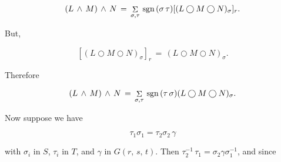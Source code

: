 \[(L\,\wedge\,M)\,\wedge\,N\,=\,\mathop{\Sigma}\limits_{\sigma,\tau}\,\mathop{ \rm sgn}\nolimits\,(\sigma\,\tau)[(L\bigcirc M\bigcirc N)_{\sigma}]_{r}.\]

But,

\[[(L\bigcirc M\bigcirc N)_{\sigma}]_{r}\,=\,(L\bigcirc M\bigcirc N)_{\sigma}.\]

Therefore

\[(L\,\wedge\,M)\,\wedge\,N\,=\,\mathop{\Sigma}\limits_{\sigma,\tau}\,\mathop{ \rm sgn}\nolimits\,(\tau\,\sigma)(L\bigcirc M\bigcirc N)_{\sigma}.\]

Now suppose we have

\[\tau_{1}\sigma_{1}=\tau_{2}\sigma_{2}\,\gamma\]

with \(\sigma_{i}\) in \(S\), \(\tau_{i}\) in \(T\), and \(\gamma\) in \(G(r,\,s,\,t)\). Then \(\tau_{2}^{-1}\,\tau_{1}=\sigma_{2}\gamma\sigma_{1}^{-1}\), and since 